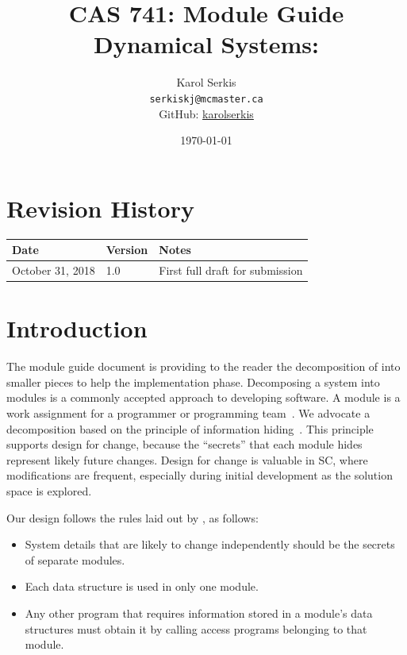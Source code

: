 \documentclass[12pt, titlepage]{article}
\begin{document}
\title{CAS 741: Module Guide\\[10pt]\Large Dynamical Systems: \progname}
\author{Karol Serkis\\\texttt{serkiskj@mcmaster.ca}\\GitHub:
\href{https://www.github.com/karolserkis}{karolserkis}}
\date{\today}

\maketitle


\section{Revision History}

\begin{tabularx}{\textwidth}{p{4cm}p{2cm}X}
\toprule {\bf Date} & {\bf Version} & {\bf Notes}\\
\midrule
October 31, 2018 & 1.0 &  First full draft for submission\\
\bottomrule
\end{tabularx}

\newpage

\tableofcontents

\listoftables

\listoffigures

\newpage


\section{Introduction}

The module guide document is providing to the reader the decomposition of 
\progname into smaller pieces to help the implementation phase.
Decomposing a system into modules is a commonly accepted approach to developing
software.  A module is a work assignment for a programmer or programming
team~\citep{ParnasEtAl1984}.  We advocate a decomposition
based on the principle of information hiding~\citep{Parnas1972a}.  This
principle supports design for change, because the ``secrets'' that each module
hides represent likely future changes.  Design for change is valuable in SC,
where modifications are frequent, especially during initial development as the
solution space is explored.  

Our design follows the rules laid out by \citet{ParnasEtAl1984}, as follows:
\begin{itemize}
\item System details that are likely to change independently should be the
  secrets of separate modules.
\item Each data structure is used in only one module.
\item Any other program that requires information stored in a module's data
  structures must obtain it by calling access programs belonging to that module.
\end{itemize}
\end{document}
